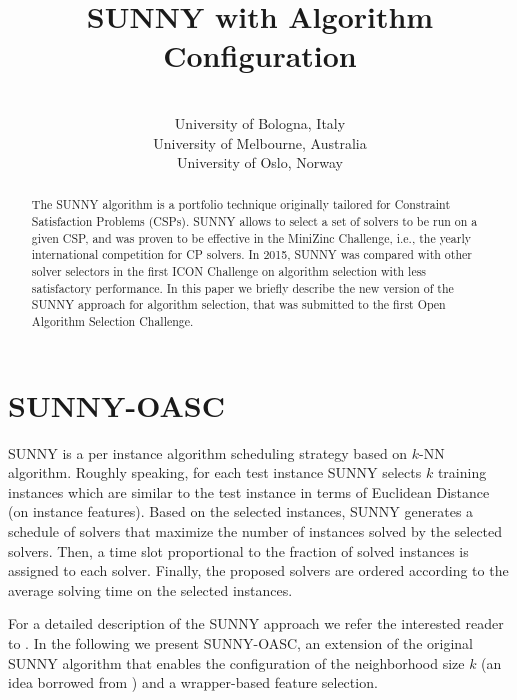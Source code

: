 \documentclass[tablecaption=bottom,wcp]{jmlr} %
\title[SUNNY-OASC]{SUNNY with Algorithm Configuration}
\author{\Name{Tong Liu} \Email{t.liu@unibo.it}\\
 \addr University of Bologna, Italy 
 \AND
 \Name{Roberto Amadini} \Email{roberto.amadini@unimelb.edu.au}\\
 \addr University of Melbourne, Australia
 \AND
 \Name{Jacopo Mauro} \Email{mauro.jacopo@gmail.com}\\
 \addr University of Oslo, Norway
 }
\begin{document}
\maketitle

\begin{abstract}%
The SUNNY algorithm is a portfolio technique originally tailored for 
Constraint Satisfaction Problems (CSPs). SUNNY allows to select a set of 
solvers to be run on a given CSP, and was proven to be effective in the 
MiniZinc Challenge, i.e., the yearly international competition 
for CP solvers. In 2015, SUNNY was compared with other solver selectors in the 
first ICON Challenge on algorithm selection with less satisfactory performance.
In this paper we briefly describe the new version of the SUNNY approach for 
algorithm selection, that was submitted to the first Open Algorithm 
Selection Challenge.
\end{abstract}


\section{SUNNY-OASC}


SUNNY is a per instance algorithm scheduling strategy based on $k$-NN algorithm. Roughly 
speaking, for each test instance SUNNY selects
$k$ training instances which are similar to the test instance
in terms of Euclidean Distance (on instance features). Based on the selected instances,
SUNNY generates a schedule of solvers that maximize the number of
instances solved by the selected solvers. 
Then, a time slot proportional to the fraction of solved instances is
assigned to each solver. Finally, the proposed solvers are ordered
according to the average solving time on the selected instances.

For a detailed description of the SUNNY approach we refer the interested 
reader to \cite{sunny,sunnycp2,paper_amai}.
In the following we present SUNNY-OASC, an extension of the
original SUNNY algorithm that enables the configuration of the neighborhood 
size $k$ 
(an idea borrowed from \cite{DBLP:conf/lion/LindauerBH16}) and a 
wrapper-based feature selection.
\end{document}

